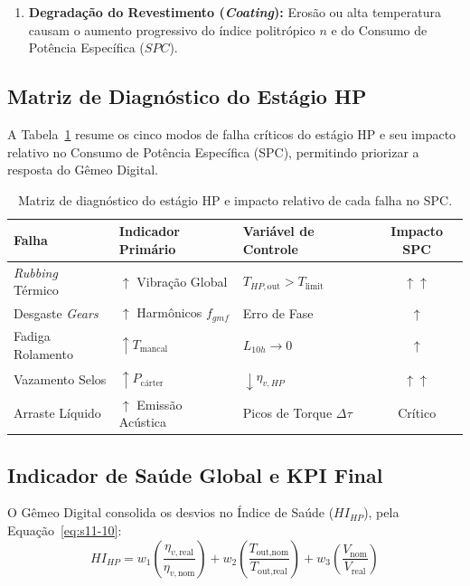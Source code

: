 \documentclass[12pt,a4paper]{article}
\numberwithin{equation}{section}
\numberwithin{table}{section}
\numberwithin{figure}{section}
\begin{document}
{\begin{enumerate}
		\item \textbf{Degradação do Revestimento (\textit{Coating}):}
		Erosão ou alta temperatura causam o aumento progressivo do índice politrópico $n$ e do Consumo de Potência Específica ($SPC$).
	\end{enumerate}
	
	\subsection{\textbf{Matriz de Diagnóstico do Estágio HP}}

	A Tabela~\ref{tab:11-1} resume os cinco modos de falha críticos do estágio HP e seu impacto relativo no Consumo de Potência Específica (SPC), permitindo priorizar a resposta do Gêmeo Digital.
	\begin{table}[h!tbp]
		\centering
		\small
		\renewcommand{\arraystretch}{1.5}
		\begin{tabular}{l l l c}
			\toprule
			\textbf{Falha} & \textbf{Indicador Primário} & \textbf{Variável de Controle} & \textbf{Impacto SPC} \\ \midrule
			\textit{Rubbing} Térmico & $\uparrow$ Vibração Global & $T_{HP,\text{out}} > T_{\text{limit}}$ & $\uparrow \uparrow$ \\
			Desgaste \textit{Gears} & $\uparrow$ Harmônicos $f_{gmf}$ & Erro de Fase & $\uparrow$ \\
			Fadiga Rolamento & $\uparrow T_{\text{mancal}}$ & $L_{10h} \to 0$ & $\uparrow$ \\
			Vazamento Selos & $\uparrow P_{\text{cárter}}$ & $\downarrow \eta_{v,HP}$ & $\uparrow \uparrow$ \\
			Arraste Líquido & $\uparrow$ Emissão Acústica & Picos de Torque $\Delta \tau$ & Crítico \\ \bottomrule
		\end{tabular}
		\caption[Matriz de diagnóstico do estágio HP]{Matriz de diagnóstico do estágio HP e impacto relativo de cada falha no SPC.}
		\label{tab:11-1}
	\end{table}
	
	\subsection{\textbf{Indicador de Saúde Global e KPI Final}}
	O Gêmeo Digital consolida os desvios no Índice de Saúde ($HI_{HP}$), pela Equação~\eqref{eq:s11-10}:
	\begin{equation}\label{eq:s11-10}
 HI_{HP} = w_1 \left( \frac{\eta_{v,\text{real}}}{\eta_{v,\text{nom}}} \right) + w_2 \left( \frac{T_{\text{out,nom}}}{T_{\text{out,real}}} \right) + w_3 \left( \frac{V_{\text{nom}}}{V_{\text{real}}} \right) 
\end{equation}
	
}
\end{document}
